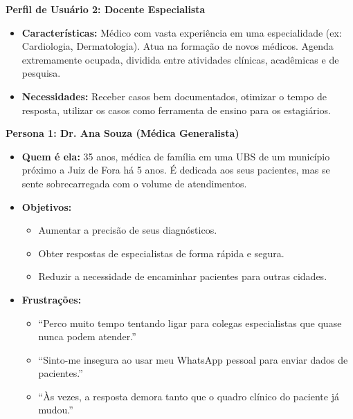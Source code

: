 \documentclass[12pt, a4paper, oneside]{abntex2}
\begin{document}
\textbf{Perfil de Usuário 2: Docente Especialista}
\begin{itemize}
    \item \textbf{Características:} Médico com vasta experiência em uma especialidade (ex: Cardiologia, Dermatologia). Atua na formação de novos médicos. Agenda extremamente ocupada, dividida entre atividades clínicas, acadêmicas e de pesquisa.
    \item \textbf{Necessidades:} Receber casos bem documentados, otimizar o tempo de resposta, utilizar os casos como ferramenta de ensino para os estagiários.
\end{itemize}

\textbf{Persona 1: Dr. Ana Souza (Médica Generalista)}
\begin{itemize}
    \item \textbf{Quem é ela:} 35 anos, médica de família em uma UBS de um município próximo a Juiz de Fora há 5 anos. É dedicada aos seus pacientes, mas se sente sobrecarregada com o volume de atendimentos.
    \item \textbf{Objetivos:}
    \begin{itemize}
        \item Aumentar a precisão de seus diagnósticos.
        \item Obter respostas de especialistas de forma rápida e segura.
        \item Reduzir a necessidade de encaminhar pacientes para outras cidades.
    \end{itemize}
    \item \textbf{Frustrações:}
    \begin{itemize}
        \item ``Perco muito tempo tentando ligar para colegas especialistas que quase nunca podem atender.''
        \item ``Sinto-me insegura ao usar meu WhatsApp pessoal para enviar dados de pacientes.''
        \item ``Às vezes, a resposta demora tanto que o quadro clínico do paciente já mudou.''
    \end{itemize}
\end{itemize}
\end{document}
